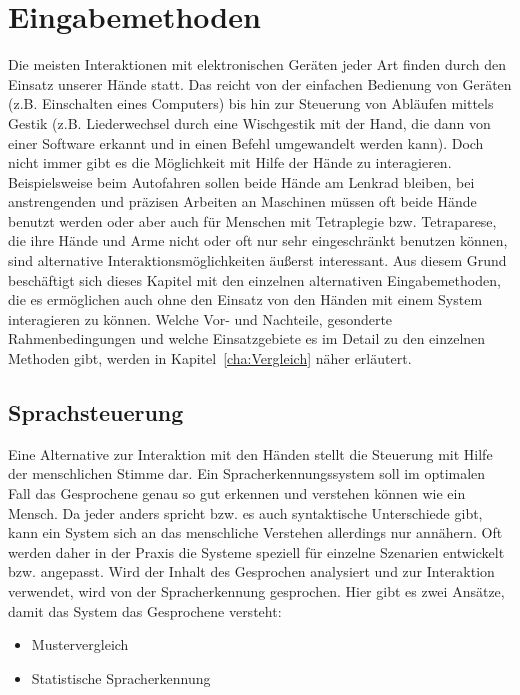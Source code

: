 \chapter{Eingabemethoden}
\label{cha:Eingabe}

Die meisten Interaktionen mit elektronischen Geräten jeder Art finden durch den Einsatz unserer Hände statt. Das reicht von der einfachen Bedienung von Geräten (z.B. Einschalten eines Computers) bis hin zur Steuerung von Abläufen mittels Gestik (z.B. Liederwechsel durch eine Wischgestik mit der Hand, die dann von einer Software erkannt und in einen Befehl umgewandelt werden kann). Doch nicht immer gibt es die Möglichkeit mit Hilfe der Hände zu interagieren. Beispielsweise beim Autofahren sollen beide Hände am Lenkrad bleiben, bei anstrengenden und präzisen Arbeiten an Maschinen müssen oft beide Hände benutzt werden oder aber auch für Menschen mit Tetraplegie bzw. Tetraparese, die ihre Hände und Arme nicht oder oft nur sehr eingeschränkt benutzen können, sind alternative Interaktionsmöglichkeiten äußerst interessant. Aus diesem Grund beschäftigt sich dieses Kapitel mit den einzelnen alternativen Eingabemethoden, die es ermöglichen auch ohne den Einsatz von den Händen mit einem System interagieren zu können. Welche Vor- und Nachteile, gesonderte Rahmenbedingungen und welche Einsatzgebiete es im Detail zu den einzelnen Methoden gibt, werden in Kapitel~\ref{cha:Vergleich} näher erläutert. 

\section{Sprachsteuerung}

Eine Alternative zur Interaktion mit den Händen stellt die Steuerung mit Hilfe der menschlichen Stimme dar. Ein Spracherkennungssystem soll im optimalen Fall das Gesprochene genau so gut erkennen und verstehen können wie ein Mensch. Da jeder anders spricht bzw. es auch syntaktische Unterschiede gibt, kann ein System sich an das menschliche Verstehen allerdings nur annähern. Oft werden daher in der Praxis die Systeme speziell für einzelne Szenarien entwickelt bzw. angepasst. 
\newlinew \newline
Wird der Inhalt des Gesprochen analysiert und zur Interaktion verwendet, wird von der Spracherkennung gesprochen. Hier gibt es zwei Ansätze, damit das System das Gesprochene versteht:
\begin{itemize}
      \item Mustervergleich
      \item Statistische Spracherkennung
\end{itemize}

